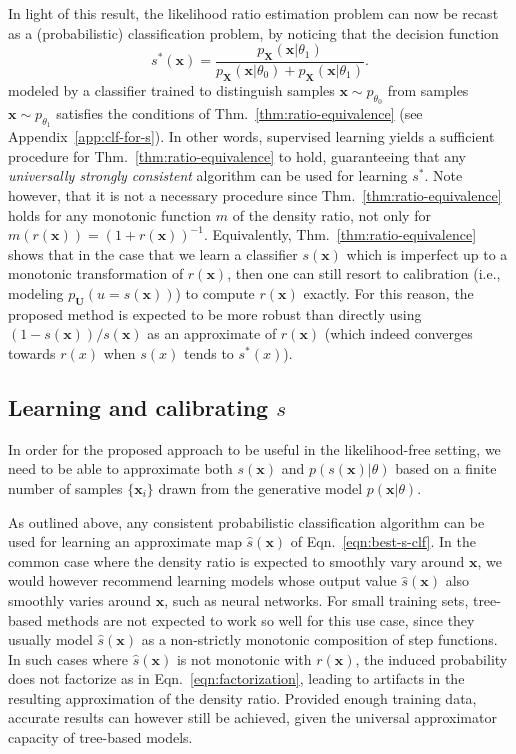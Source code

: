 \documentclass[12pt]{article}
\numberwithin{equation}{section}
\theoremstyle{plain}
\begin{document}
In light of this result, the likelihood ratio estimation problem can now
be recast as a (probabilistic) classification problem, by noticing that the decision
function
\begin{equation}\label{eqn:best-s-clf}
s^*(\mathbf{x}) = \frac{p_{\mathbf{X}}(\mathbf{x}|\theta_1)}{p_{\mathbf{X}}(\mathbf{x} | \theta_0) + p_{\mathbf{X}}(\mathbf{x} | \theta_1)}.
\end{equation}
modeled by a classifier trained to distinguish samples $\mathbf{x} \sim p_{\theta_0}$
from samples $\mathbf{x} \sim p_{\theta_1}$ satisfies the conditions of
Thm.~\ref{thm:ratio-equivalence} (see Appendix~\ref{app:clf-for-s}).
In other words, supervised learning yields a sufficient
procedure for Thm.~\ref{thm:ratio-equivalence} to hold, guaranteeing that any
{\it universally strongly consistent} algorithm can be used for learning $s^*$.
Note however, that it is not a necessary procedure since
Thm.~\ref{thm:ratio-equivalence} holds for any monotonic function $m$ of the
density ratio,  not only for $m(r(\mathbf{x})) = (1 +
r(\mathbf{x}))^{-1}$.
Equivalently,
Thm.~\ref{thm:ratio-equivalence} shows that in the case that we learn a
classifier $s(\mathbf{x})$ which is imperfect up to a monotonic transformation
of $r(\mathbf{x})$, then one can still resort to calibration (i.e., modeling
$p_{\mathbf{U}}(u=s(\mathbf{x}))$) to compute $r(\mathbf{x})$ exactly.
For this reason, the proposed method is expected to be more robust than
directly using ${(1 - s(\mathbf{x}))}/{s(\mathbf{x})}$ as an approximate of
$r(\mathbf{x})$ (which indeed converges towards $r(x)$ when $s(x)$ tends to $s^*(x)$).


\subsection{Learning and calibrating $s$}\label{s:learning_calibration}

In order for the proposed approach to be useful in the likelihood-free setting,
we need to be able to approximate both $s(\mathbf{x})$ and
$p(s(\mathbf{x})|\theta)$ based on a finite number of samples $\{\mathbf{x}_i\}$
drawn from the generative model $p(\mathbf{x}|\theta)$.

As outlined above, any consistent probabilistic classification algorithm can be
used for learning an approximate  map $\hat{s}(\mathbf{x})$ of
Eqn.~\ref{eqn:best-s-clf}. In the common case where the density ratio is
expected to smoothly vary around $\mathbf{x}$, we would however recommend
learning models whose output value $\hat{s}(\mathbf{x})$ also smoothly varies
around $\mathbf{x}$, such as neural networks. For small training sets, tree-based
methods are not expected to work so well for this use case, since they usually
model $\hat{s}(\mathbf{x})$ as a non-strictly monotonic composition of step functions.
In such cases where $\hat s(\mathbf{x})$ is not monotonic with $r(\mathbf{x})$,
the induced probability does not factorize as in Eqn.~\ref{eqn:factorization},
leading to artifacts in the resulting approximation of the density ratio.
Provided enough training data, accurate results can however still be achieved,
given the universal approximator capacity of tree-based models.
\end{document}
